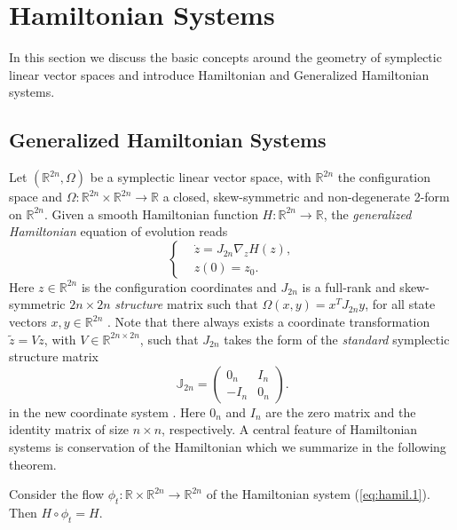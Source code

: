 \section{Hamiltonian Systems}
\label{sec:hamil}

In this section we discuss the basic concepts around the geometry of symplectic linear vector spaces and introduce Hamiltonian and Generalized Hamiltonian systems.

\subsection{Generalized Hamiltonian Systems}
\label{sec:hamil.1}

Let $(\mathbb R^{2n}, \Omega)$ be a symplectic linear vector space, with $\mathbb R^{2n}$ the configuration space and $\Omega:\mathbb R^{2n}\times\mathbb R^{2n} \to \mathbb R$ a closed, skew-symmetric and non-degenerate 2-form on $\mathbb R^{2n}$. Given a smooth Hamiltonian function $H:\mathbb R^{2n} \to \mathbb R$, the \emph{generalized Hamiltonian} equation of evolution reads
\begin{equation} \label{eq:hamil.1}
\left\{
\begin{aligned}
	& \dot z = J_{2n} \nabla_z H(z),  \\
	&  z(0) = z_0.
\end{aligned}
\right.
\end{equation}
Here $z\in \mathbb R^{2n}$ is the configuration coordinates and $J_{2n}$ is a full-rank and skew-symmetric $2n\times 2n$ \emph{structure} matrix such that $\Omega(x,y) = x^TJ_{2n}y$, for all state vectors $x,y\in \mathbb R^{2n}$ \cite{Marsden:2010:IMS:1965128}. Note that there always exists a coordinate transformation $\tilde z = V z$, with $V \in \mathbb R^{2n\times 2n}$, such that $J_{2n}$ takes the form of the \emph{standard} symplectic structure matrix
\begin{equation} \label{eq:hamil.2}
	\mathbb{J}_{2n} = 
	\begin{pmatrix}
	0_n & I_n \\
	-I_n & 0_n
	\end{pmatrix}.
\end{equation}
in the new coordinate system \cite{de2006symplectic}.
Here $0_n$ and $I_n$ are the zero matrix and the identity matrix of size $n\times n$, respectively. A central feature of Hamiltonian systems is conservation of the Hamiltonian which we summarize in the following theorem.
\begin{theorem} \label{thm:1}
\cite{Marsden:2010:IMS:1965128} Consider the flow $\phi_t:\mathbb R \times \mathbb R^{2n} \to \mathbb R^{2n}$ of the Hamiltonian system (\ref{eq:hamil.1}). Then $H \circ \phi_t = H$.
\end{theorem}

